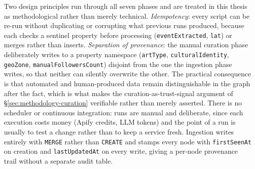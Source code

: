 \documentclass[12pt, a4paper]{report}
\begin{document}
Two design principles run through all seven phases and are treated in
this thesis as methodological rather than merely technical.
\emph{Idempotency}: every script can be re-run without duplicating or
corrupting what previous runs produced, because each checks a sentinel
property before processing (\texttt{eventExtracted}, \texttt{lat}) or
merges rather than inserts. \emph{Separation of provenance}: the manual
curation phase deliberately writes to a property namespace
(\texttt{artType}, \texttt{culturalIdentity}, \texttt{geoZone},
\texttt{manualFollowersCount}) disjoint from the one the ingestion phase
writes, so that neither can silently overwrite the other. The practical
consequence is that automated and human-produced data remain
distinguishable in the graph after the fact, which is what makes the
curation-as-trust-signal argument of \S\ref{sec:methodology-curation}
verifiable rather than merely asserted. There is no scheduler or
continuous integration: runs are manual and deliberate, since each
execution costs money (Apify credits, LLM tokens) and the point of a run
is usually to test a change rather than to keep a service fresh.
Ingestion writes entirely with \texttt{MERGE} rather than
\texttt{CREATE} and stamps every node with \texttt{firstSeenAt} on
creation and \texttt{lastUpdatedAt} on every write, giving a per-node
provenance trail without a separate audit table.
\end{document}
